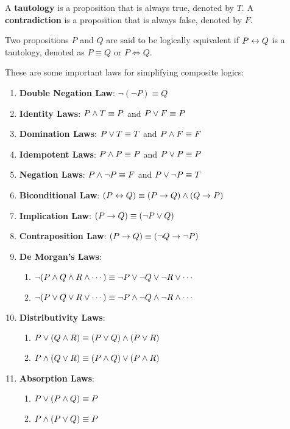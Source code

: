 \begin{definition}
    A \textbf{tautology} is a proposition that is always true, denoted by $T$.
    A \textbf{contradiction} is a proposition that is always false, denoted by $F$.
\end{definition}

\begin{definition}
    Two propositions $P$ and $Q$ are said to be logically equivalent if $P \leftrightarrow Q$ is a tautology,
    denoted as $P \equiv Q$ or $P \Leftrightarrow Q$.
\end{definition}

\begin{theorem}
    These are some important laws for simplifying composite logics:
    \begin{enumerate}
        \item \textbf{Double Negation Law}: $\neg(\neg P) \equiv Q$
        \item \textbf{Identity Laws}: $P \wedge T \equiv P$ and $P \vee F \equiv P$
        \item \textbf{Domination Laws}: $P \vee T \equiv T$ and $P \wedge F \equiv F$
        \item \textbf{Idempotent Laws}: $P \wedge P \equiv P$ and $P \vee P \equiv P$
        \item \textbf{Negation Laws}: $P \wedge \neg P \equiv F$ and $P \vee \neg P \equiv T$
        \item \textbf{Biconditional Law}: $(P \leftrightarrow Q) \equiv (P \rightarrow Q) \wedge (Q \rightarrow P)$
        \item \textbf{Implication Law}: $(P \rightarrow Q) \equiv (\neg P \vee Q)$
        \item \textbf{Contraposition Law}: $(P \rightarrow Q) \equiv (\neg Q \rightarrow \neg P)$
        \item \textbf{De Morgan's Laws}:
        \begin{enumerate}
            \item $\neg(P \wedge Q \wedge R \wedge \cdots) \equiv \neg P \vee \neg Q \vee \neg R \vee \cdots$
            \item $\neg(P \vee Q \vee R \vee \cdots) \equiv \neg P \wedge \neg Q \wedge \neg R \wedge \cdots$
        \end{enumerate}
        \item \textbf{Distributivity Laws}:
        \begin{enumerate}
            \item $P \vee (Q \wedge R) \equiv (P \vee Q) \wedge (P \vee R)$
            \item $P \wedge (Q \vee R) \equiv (P \wedge Q) \vee (P \wedge R)$
        \end{enumerate}
        \item \textbf{Absorption Laws}:
        \begin{enumerate}
            \item $P \vee (P \wedge Q) \equiv P$
            \item $P \wedge (P \vee Q) \equiv P$
        \end{enumerate}
    \end{enumerate}
\end{theorem}

